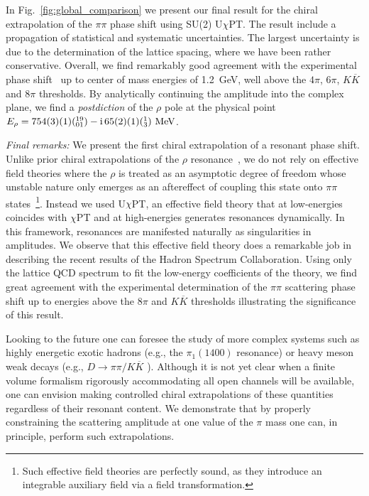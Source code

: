 \documentclass[twocolumn,hyperpdf,
amsmath,amssymb,
aps,prd,10pt,
superscriptaddress,nofootinbib,noeprint,preprintnumbers]{revtex4-1}
\newcommand{\Erho}{\rm 754(3)(1)(^{19}_{01})-i\,65(2)(1)(^{1}_{3})~MeV}
\begin{document}
In Fig.~\ref{fig:global_comparison} we present our final result for the chiral extrapolation of the $\pi\pi$ phase shift using SU(2) U$\chi$PT. The result include a propagation of statistical and systematic uncertainties. The largest uncertainty is due to the determination of the lattice spacing, where we have been rather conservative. Overall, we find remarkably good agreement with the experimental phase shift~\cite{Protopopescu:1973sh, Estabrooks:1974vu} up to center of mass energies of 1.2~GeV, well above the $4\pi$, $6\pi$, $K\overline{K}$ and $8\pi$ thresholds. By analytically continuing the amplitude into the complex plane, we find a \emph{postdiction} of the $\rho$ pole at the physical point $E_\rho=\Erho$.  
  

\emph{Final remarks:} We present the first chiral extrapolation of a resonant phase shift. Unlike prior chiral extrapolations of the $\rho$ resonance~\cite{Leinweber:2001ac, Feng:2010es}, we do not rely on effective field theories where the $\rho$ is treated as an asymptotic degree of freedom whose unstable nature only emerges as an aftereffect of coupling this state onto $\pi\pi$ states~\footnote{Such effective field theories are perfectly sound, as they introduce an integrable auxiliary field via a field transformation.}. Instead we used U$\chi$PT, an effective field theory that at low-energies coincides with $\chi$PT and at high-energies generates resonances dynamically. In this framework, resonances are manifested naturally as singularities in amplitudes. We observe that this effective field theory does a remarkable job in describing the recent results of the Hadron Spectrum Collaboration. Using only the lattice QCD spectrum to fit the low-energy coefficients of the theory, we find great agreement with the experimental determination of the $\pi\pi$ scattering phase shift up to energies above the $8\pi$ and $K\overline{K}$ thresholds illustrating the significance of this result. 

Looking to the future one can foresee the study of more complex systems such as highly energetic exotic hadrons (e.g., the $\pi_1(1400)$ resonance) or heavy meson weak decays (e.g., $D\rightarrow \pi\pi/K\overline{K}$ \cite{Hansen:2012tf, Aaij:2011in}). Although it is not yet clear when a finite volume formalism rigorously accommodating all open channels will be available, one can envision making controlled chiral extrapolations of these quantities regardless of their resonant content. We demonstrate that by properly constraining the scattering amplitude at one value of the $\pi$ mass one can, in principle, perform such extrapolations.
\end{document}
